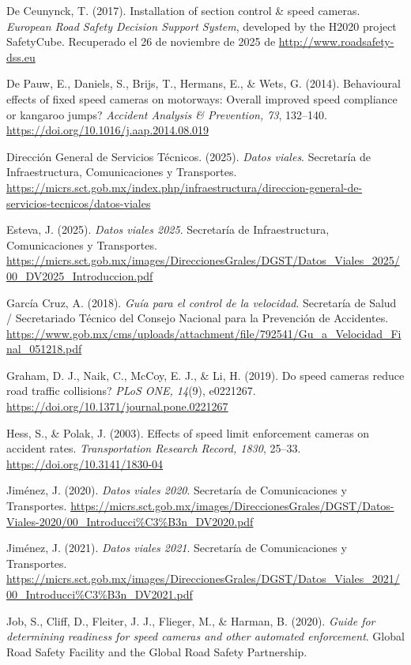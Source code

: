 \begin{thebibliography}{}
De Ceunynck, T. (2017). Installation of section control \& speed cameras. \textit{European Road Safety Decision Support System}, developed by the H2020 project SafetyCube. Recuperado el 26 de noviembre de 2025 de \url{http://www.roadsafety-dss.eu}

De Pauw, E., Daniels, S., Brijs, T., Hermans, E., \& Wets, G. (2014). Behavioural effects of fixed speed cameras on motorways: Overall improved speed compliance or kangaroo jumps? \textit{Accident Analysis \& Prevention, 73}, 132–140. \url{https://doi.org/10.1016/j.aap.2014.08.019}

Dirección General de Servicios Técnicos. (2025). \textit{Datos viales}. Secretaría de Infraestructura, Comunicaciones y Transportes. \url{https://micrs.sct.gob.mx/index.php/infraestructura/direccion-general-de-servicios-tecnicos/datos-viales}

Esteva, J. (2025). \textit{Datos viales 2025}. Secretaría de Infraestructura, Comunicaciones y Transportes. \url{https://micrs.sct.gob.mx/images/DireccionesGrales/DGST/Datos_Viales_2025/00_DV2025_Introduccion.pdf}

García Cruz, A. (2018). \textit{Guía para el control de la velocidad}. Secretaría de Salud / Secretariado Técnico del Consejo Nacional para la Prevención de Accidentes. \url{https://www.gob.mx/cms/uploads/attachment/file/792541/Gu_a_Velocidad_Final_051218.pdf}

Graham, D. J., Naik, C., McCoy, E. J., \& Li, H. (2019). Do speed cameras reduce road traffic collisions? \textit{PLoS ONE, 14}(9), e0221267. \url{https://doi.org/10.1371/journal.pone.0221267}

Hess, S., \& Polak, J. (2003). Effects of speed limit enforcement cameras on accident rates. \textit{Transportation Research Record, 1830}, 25–33. \url{https://doi.org/10.3141/1830-04}

Jiménez, J. (2020). \textit{Datos viales 2020}. Secretaría de Comunicaciones y Transportes. \url{https://micrs.sct.gob.mx/images/DireccionesGrales/DGST/Datos-Viales-2020/00_Introducci%C3%B3n_DV2020.pdf}

Jiménez, J. (2021). \textit{Datos viales 2021}. Secretaría de Comunicaciones y Transportes. \url{https://micrs.sct.gob.mx/images/DireccionesGrales/DGST/Datos_Viales_2021/00_Introducci%C3%B3n_DV2021.pdf}

Job, S., Cliff, D., Fleiter, J. J., Flieger, M., \& Harman, B. (2020). \textit{Guide for determining readiness for speed cameras and other automated enforcement}. Global Road Safety Facility and the Global Road Safety Partnership.


\end{thebibliography}
